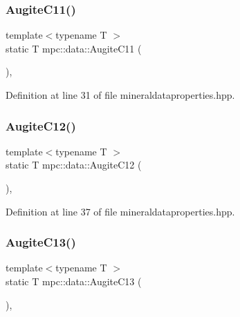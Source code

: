 \subsubsection{\texorpdfstring{Augite\+C11()}{AugiteC11()}}
{\footnotesize\ttfamily template$<$typename T $>$ \\
static T mpc\+::data\+::\+Augite\+C11 (\begin{DoxyParamCaption}{ }\end{DoxyParamCaption})\hspace{0.3cm}{\ttfamily [inline]}, {\ttfamily [static]}}



Definition at line 31 of file mineraldataproperties.\+hpp.

\mbox{\label{namespacempc_1_1data_abb8eaf04e7845bfc6effc1c79e859d6e}} 
\subsubsection{\texorpdfstring{Augite\+C12()}{AugiteC12()}}
{\footnotesize\ttfamily template$<$typename T $>$ \\
static T mpc\+::data\+::\+Augite\+C12 (\begin{DoxyParamCaption}{ }\end{DoxyParamCaption})\hspace{0.3cm}{\ttfamily [inline]}, {\ttfamily [static]}}



Definition at line 37 of file mineraldataproperties.\+hpp.

\mbox{\label{namespacempc_1_1data_a845dad178d268b5c7b23f322558f9df1}} 
\subsubsection{\texorpdfstring{Augite\+C13()}{AugiteC13()}}
{\footnotesize\ttfamily template$<$typename T $>$ \\
static T mpc\+::data\+::\+Augite\+C13 (\begin{DoxyParamCaption}{ }\end{DoxyParamCaption})\hspace{0.3cm}{\ttfamily [inline]}, {\ttfamily [static]}}



